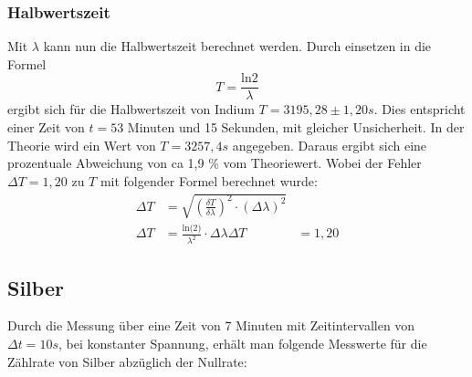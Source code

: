 \subsubsection{Halbwertszeit}
\label{sec:IH}

Mit $\lambda$ kann nun die Halbwertszeit berechnet werden.
Durch einsetzen in die Formel 
\begin{equation}
  T = \frac{\text{ln}2}{\lambda}
  \label{eqn:glTot}
\end{equation}
ergibt sich für die Halbwertszeit von Indium $T = 3195,28 \pm 1,20 s$.
Dies entspricht einer Zeit von $t = 53$ Minuten und 15 Sekunden, mit gleicher Unsicherheit.
In der Theorie wird ein Wert von $T = 3257,4 s$ \cite{Periode} angegeben.
Daraus ergibt sich eine prozentuale Abweichung von ca 1,9 \% vom Theoriewert.
Wobei der Fehler $\Delta T = 1,20$ zu $T$ mit folgender Formel berechnet wurde:
\begin{align*}
  \Delta T &= \sqrt{\left(\frac{\delta T}{\delta \lambda}\right)^2 \cdot \left(\Delta \lambda\right)^2} \\
  \Delta T &= \frac{\text{ln(2)}}{\lambda^2} \cdot \Delta \lambda
  \Delta T &= 1,20
\end{align*}

\subsection{Silber}
\label{sec:silber}

Durch die Messung über eine Zeit von 7 Minuten mit Zeitintervallen von $\Delta t = 10s$, bei konstanter Spannung, erhält man folgende Messwerte für die Zählrate von Silber abzüglich der Nullrate:

